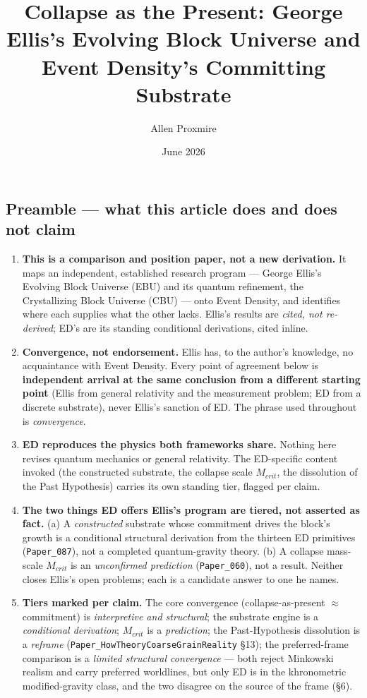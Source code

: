 \documentclass[
  11pt,
]{article}
\title{Collapse as the Present: George Ellis's Evolving Block Universe
and Event Density's Committing Substrate}
\author{Allen Proxmire}
\date{June 2026}
\providecommand{\tightlist}{%
  \setlength{\itemsep}{0pt}\setlength{\parskip}{0pt}}
\providecommand{\tightlist}{}
\begin{document}
\maketitle

\subsection{Preamble --- what this article does and does not
claim}\label{preamble-what-this-article-does-and-does-not-claim}

\begin{enumerate}
\def\labelenumi{\arabic{enumi}.}
\tightlist
\item
  \textbf{This is a comparison and position paper, not a new
  derivation.} It maps an independent, established research program ---
  George Ellis's Evolving Block Universe (EBU) and its quantum
  refinement, the Crystallizing Block Universe (CBU) --- onto Event
  Density, and identifies where each supplies what the other lacks.
  Ellis's results are \emph{cited, not re-derived}; ED's are its
  standing conditional derivations, cited inline.
\item
  \textbf{Convergence, not endorsement.} Ellis has, to the author's
  knowledge, no acquaintance with Event Density. Every point of
  agreement below is \textbf{independent arrival at the same conclusion
  from a different starting point} (Ellis from general relativity and
  the measurement problem; ED from a discrete substrate), never Ellis's
  sanction of ED. The phrase used throughout is \emph{convergence}.
\item
  \textbf{ED reproduces the physics both frameworks share.} Nothing here
  revises quantum mechanics or general relativity. The ED-specific
  content invoked (the constructed substrate, the collapse scale
  \(M_{crit}\), the dissolution of the Past Hypothesis) carries its own
  standing tier, flagged per claim.
\item
  \textbf{The two things ED offers Ellis's program are tiered, not
  asserted as fact.} (a) A \emph{constructed} substrate whose commitment
  drives the block's growth is a conditional structural derivation from
  the thirteen ED primitives (\texttt{Paper\_087}), not a completed
  quantum-gravity theory. (b) A collapse mass-scale \(M_{crit}\) is an
  \emph{unconfirmed prediction} (\texttt{Paper\_060}), not a result.
  Neither closes Ellis's open problems; each is a candidate answer to
  one he names.
\item
  \textbf{Tiers marked per claim.} The core convergence
  (collapse-as-present \(\approx\) commitment) is \emph{interpretive and
  structural}; the substrate engine is a \emph{conditional derivation};
  \(M_{crit}\) is a \emph{prediction}; the Past-Hypothesis dissolution
  is a \emph{reframe} (\texttt{Paper\_HowTheoryCoarseGrainReality} §13);
  the preferred-frame comparison is a \emph{limited structural
  convergence} --- both reject Minkowski realism and carry preferred
  worldlines, but only ED is in the khronometric modified-gravity class,
  and the two disagree on the source of the frame (§6).
\end{enumerate}
\end{document}

